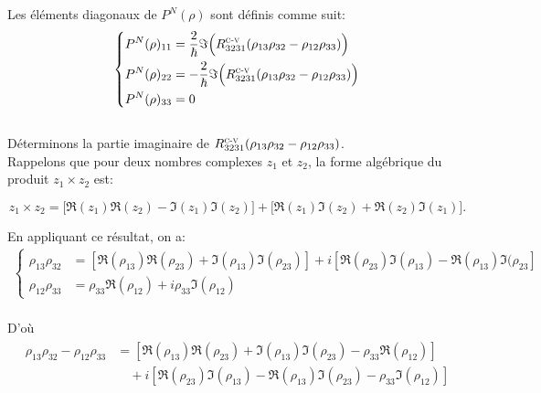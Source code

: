 \documentclass[12pt,a4paper,openany,oneside]{book}
\begin{document}
{{{{{{Les éléments diagonaux de $  P^{N}(\rho) $ sont définis comme suit:
 \begin{eqnarray*}
 \left\{
\begin{split}
P^{N}(\rho)_{11} &= \dfrac{2}{\hbar}\Im\Big(R^{\textsc{c-v}}_{3231}(\rho_{13}\rho_{32}-\rho_{12}\rho_{33})\Big)\\
P^{N}(\rho)_{22} &= -\dfrac{2}{\hbar}\Im\Big(R^{\textsc{c-v}}_{3231}(\rho_{13}\rho_{32}-\rho_{12}\rho_{33})\Big)\\
P^{N}(\rho)_{33} &= 0
\end{split}
\right.
 \end{eqnarray*}\\
 
Déterminons la partie imaginaire de $ R^{\textsc{c-v}}_{3231}(\rho_{13}\rho_{32}-\rho_{12}\rho_{33})$. \\

Rappelons que pour deux nombres complexes $ z_{1} $ et $ z_{2} $, la forme algébrique du produit 
$ z_{1}\times z_{2} $ est: 

$$ z_{1}\times z_{2}=\big[\Re(z_{1})\Re(z_{2})-\Im(z_{1})\Im(z_{2})\big]+\big[\Re(z_{1})\Im(z_{2})+\Re(z_{2})\Im(z_{1})\big]. $$

En appliquant ce résultat, on a:
\begin{eqnarray*}
 \left\{
\begin{split}
\rho_{13}\rho_{32} &=  [ \Re(\rho_{13})\Re(\rho_{23})+\Im(\rho_{13})\Im(\rho_{23})] + i[\Re(\rho_{23})\Im(\rho_{13})-\Re(\rho_{13})\Im(\rho_{23}] \\
\rho_{12}\rho_{33} &=  \rho_{33}\Re(\rho_{12}) + i\rho_{33}\Im(\rho_{12})                    
\end{split}
\right.
 \end{eqnarray*}\\
D'où 
\begin{eqnarray*}
\begin{split}
\rho_{13}\rho_{32}-\rho_{12}\rho_{33} &= [ \Re(\rho_{13})\Re(\rho_{23})+\Im(\rho_{13})\Im(\rho_{23})-\rho_{33}\Re(\rho_{12})] \\
&\quad + i[\Re(\rho_{23})\Im(\rho_{13})-\Re(\rho_{13})\Im(\rho_{23})-\rho_{33}\Im(\rho_{12})]
\end{split}
\end{eqnarray*}

}}}}}}
\end{document}
